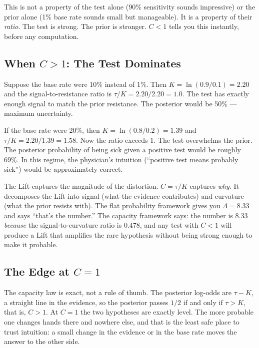 \documentclass[12pt]{article}
\begin{document}
This is not a property of the test alone (90\% sensitivity sounds impressive) or the prior alone (1\% base rate sounds small but manageable). It is a property of their \textit{ratio}. The test is strong. The prior is stronger. $C < 1$ tells you this instantly, before any computation.

\subsection{When $C > 1$: The Test Dominates}

Suppose the base rate were 10\% instead of 1\%. Then $K = \ln(0.9/0.1) = 2.20$ and the signal-to-resistance ratio is $\tau/K = 2.20/2.20 = 1.0$. The test has exactly enough signal to match the prior resistance. The posterior would be 50\% --- maximum uncertainty.

If the base rate were 20\%, then $K = \ln(0.8/0.2) = 1.39$ and $\tau/K = 2.20/1.39 = 1.58$. Now the ratio exceeds 1. The test overwhelms the prior. The posterior probability of being sick given a positive test would be roughly 69\%. In this regime, the physician's intuition (``positive test means probably sick'') would be approximately correct.

The Lift captures the magnitude of the distortion. $C = \tau/K$ captures \textit{why}. It decomposes the Lift into signal (what the evidence contributes) and curvature (what the prior resists with). The flat probability framework gives you $\Lambda = 8.33$ and says ``that's the number.'' The capacity framework says: the number is 8.33 \textit{because} the signal-to-curvature ratio is 0.478, and any test with $C < 1$ will produce a Lift that amplifies the rare hypothesis without being strong enough to make it probable.

\subsection{The Edge at $C = 1$}\label{sec:edge}

The capacity law is exact, not a rule of thumb. The posterior log-odds are $\tau - K$, a straight line in the
evidence, so the posterior passes $1/2$ if and only if $\tau > K$, that is, $C > 1$. At $C = 1$ the two hypotheses are
exactly level. The more probable one changes hands there and nowhere else, and that is the least safe place to trust
intuition: a small change in the evidence or in the base rate moves the answer to the other side.
\end{document}

